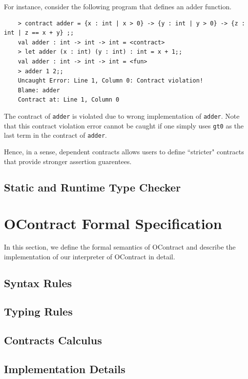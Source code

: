 \documentclass[a4paper]{article}
\begin{document}
For instance, consider the following program that defines an adder function.

\begin{verbatim}
    > contract adder = {x : int | x > 0} -> {y : int | y > 0} -> {z : int | z == x + y} ;;
    val adder : int -> int -> int = <contract>
    > let adder (x : int) (y : int) : int = x + 1;;
    val adder : int -> int -> int = <fun>
    > adder 1 2;;
    Uncaught Error: Line 1, Column 0: Contract violation!
    Blame: adder
    Contract at: Line 1, Column 0
\end{verbatim}

The contract of \texttt{adder} is violated due to wrong implementation of \texttt{adder}.
Note that this contract violation error cannot be caught if one simply uses \texttt{gt0} as the last term in the contract of \texttt{adder}.

Hence, in a sense, dependent contracts allows users to define ``stricter" contracts that provide stronger assertion guarentees.

\subsection{Static and Runtime Type Checker}

\section{OContract Formal Specification}

In this section, we define the formal semantics of OContract and describe the implementation of our interpreter of OContract in detail.

\subsection{Syntax Rules}

\subsection{Typing Rules}

\subsection{Contracts Calculus}

\subsection{Implementation Details}



\end{document}
